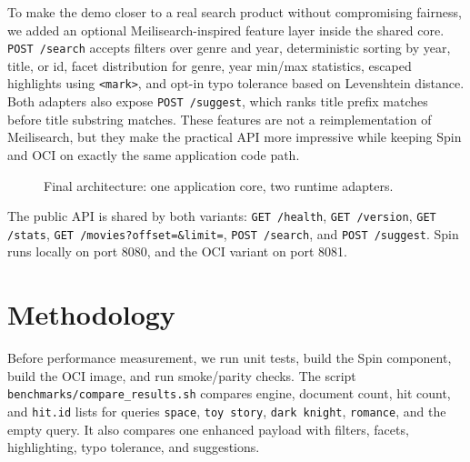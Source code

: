 \documentclass[11pt,a4paper]{article}
\begin{document}
To make the demo closer to a real search product without compromising fairness, we added an
optional Meilisearch-inspired feature layer inside the shared core. \texttt{POST /search}
accepts filters over genre and year, deterministic sorting by year, title, or id, facet
distribution for genre, year min/max statistics, escaped highlights using \texttt{<mark>},
and opt-in typo tolerance based on Levenshtein distance. Both adapters also expose
\texttt{POST /suggest}, which ranks title prefix matches before title substring matches.
These features are not a reimplementation of Meilisearch, but they make the practical API
more impressive while keeping Spin and OCI on exactly the same application code path.

\begin{figure}[H]
\centering
{}
\caption{Final architecture: one application core, two runtime adapters.}
\end{figure}

The public API is shared by both variants: \texttt{GET /health}, \texttt{GET /version},
\texttt{GET /stats}, \texttt{GET /movies?offset=\&limit=}, \texttt{POST /search}, and
\texttt{POST /suggest}. Spin runs locally on port 8080, and the OCI variant on port 8081.

\section{Methodology}

Before performance measurement, we run unit tests, build the Spin component, build the OCI
image, and run smoke/parity checks. The script \texttt{benchmarks/compare\_results.sh} compares
engine, document count, hit count, and \texttt{hit.id} lists for queries \texttt{space},
\texttt{toy story}, \texttt{dark knight}, \texttt{romance}, and the empty query. It also compares
one enhanced payload with filters, facets, highlighting, typo tolerance, and suggestions.
\end{document}
